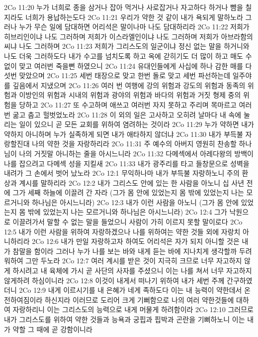 2Co 11:20  누가 너희로 종을 삼거나 잡아 먹거나 사로잡거나 자고하다 하거나 뺨을 칠지라도 너희가 용납하는도다
2Co 11:21  우리가 약한 것 같이 내가 욕되게 말하노라 그러나 누가 무슨 일에 담대하면 어리석은 말이나마 나도 담대하리라
2Co 11:22  저희가 히브리인이냐 나도 그러하며 저희가 이스라엘인이냐 나도 그러하며 저희가 아브라함의 씨냐 나도 그러하며
2Co 11:23  저희가 그리스도의 일군이냐 정신 없는 말을 하거니와 나도 더욱 그러하도다 내가 수고를 넘치도록 하고 옥에 갇히기도 더 많이 하고 매도 수없이 맞고 여러번 죽을뻔 하였으니
2Co 11:24  유대인들에게 사십에 하나 감한 매를 다섯번 맞았으며
2Co 11:25  세번 태장으로 맞고 한번 돌로 맞고 세번 파선하는데 일주야를 깊음에서 지냈으며
2Co 11:26  여러 번 여행에 강의 위험과 강도의 위험과 동족의 위험과 이방인의 위험과 시내의 위험과 광야의 위험과 바다의 위험과 거짓 형제 중의 위험을 당하고
2Co 11:27  또 수고하며 애쓰고 여러번 자지 못하고 주리며 목마르고 여러번 굶고 춥고 헐벗었노라
2Co 11:28  이 외의 일은 고사하고 오히려 날마다 내 속에 눌리는 일이 있으니 곧 모든 교회를 위하여 염려하는 것이라
2Co 11:29  누가 약하면 내가 약하지 아니하며 누가 실족하게 되면 내가 애타하지 않더냐
2Co 11:30  내가 부득불 자랑할진대 나의 약한 것을 자랑하리라
2Co 11:31  주 예수의 아버지 영원히 찬송할 하나님이 나의 거짓말 아니하는 줄을 아시느니라
2Co 11:32  다메섹에서 아레다왕의 방백이 나를 잡으려고 다메섹 성을 지킬새
2Co 11:33  내가 광주리를 타고 들창문으로 성벽을 내려가 그 손에서 벗어 났노라
2Co 12:1  무익하나마 내가 부득불 자랑하노니 주의 환상과 계시를 말하리라
2Co 12:2  내가 그리스도 안에 있는 한 사람을 아노니 십 사년 전에 그가 세째 하늘에 이끌려 간 자라 (그가 몸 안에 있었는지 몸 밖에 있었는지 나는 모르거니와 하나님은 아시느니라)
2Co 12:3  내가 이런 사람을 아노니 (그가 몸 안에 있었는지 몸 밖에 있었는지 나는 모르거니와 하나님은 아시느니라)
2Co 12:4  그가 낙원으로 이끌려가서 말할 수 없는 말을 들었으니 사람이 가히 이르지 못할 말이로다
2Co 12:5  내가 이런 사람을 위하여 자랑하겠으나 나를 위하여는 약한 것들 외에 자랑치 아니하리라
2Co 12:6  내가 만일 자랑하고자 하여도 어리석은 자가 되지 아니할 것은 내가 참말을 함이라 그러나 누가 나를 보는 바와 내게 듣는 바에 지나치게 생각할까 두려워하여 그만 두노라
2Co 12:7  여러 계시를 받은 것이 지극히 크므로 너무 자고하지 않게 하시려고 내 육체에 가시 곧 사단의 사자를 주셨으니 이는 나를 쳐서 너무 자고하지 않게하려 하심이니라
2Co 12:8  이것이 내게서 떠나기 위하여 내가 세번 주께 간구하였더니
2Co 12:9  내게 이르시기를 내 은혜가 네게 족하도다 이는 내 능력이 약한데서 온전하여짐이라 하신지라 이러므로 도리어 크게 기뻐함으로 나의 여러 약한것들에 대하여 자랑하리니 이는 그리스도의 능력으로 내게 머물게 하려함이라
2Co 12:10  그러므로 내가 그리스도를 위하여 약한 것들과 능욕과 궁핍과 핍박과 곤란을 기뻐하노니 이는 내가 약할 그 때에 곧 강함이니라

